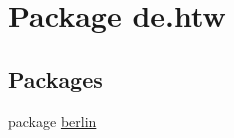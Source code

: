 \hypertarget{namespacede_1_1htw}{\section{Package de.\-htw}
\label{namespacede_1_1htw}
}
\subsection*{Packages}
\begin{DoxyCompactItemize}
\item 
package \hyperlink{namespacede_1_1htw_1_1berlin}{berlin}
\end{DoxyCompactItemize}
